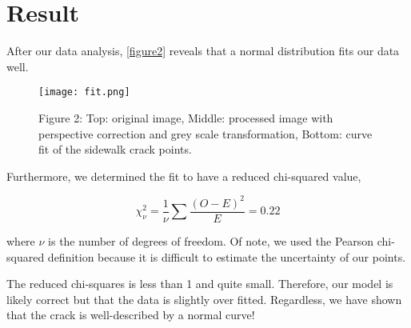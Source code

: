 \documentclass{article}
\begin{document}
\section{Result}
After our data analysis, \autoref{figure2} reveals that a normal distribution fits our data well.
\begin{figure}[h]
    \texttt{[image: fit.png]}
    \centering
    \caption{Figure 2: Top: original image, Middle: processed image with perspective correction and grey scale transformation, Bottom: curve fit of the sidewalk crack points.}
    \label{figure2}
\end{figure}

Furthermore, we determined the fit to have a reduced chi-squared value,

\begin{equation}
\chi_\nu^2 = \frac{1}{\nu}\sum\frac{(O-E)^2}{E} = 0.22
\end{equation}

where $\nu$ is the number of degrees of freedom. Of note, we used the Pearson chi-squared definition because it
is difficult to estimate the uncertainty of our points.

The reduced chi-squares is less than 1 and quite small. Therefore, our model is likely correct but that the
data is slightly over fitted. Regardless, we have shown that the crack is well-described by a normal curve!




\nocite{*}
\end{document}
